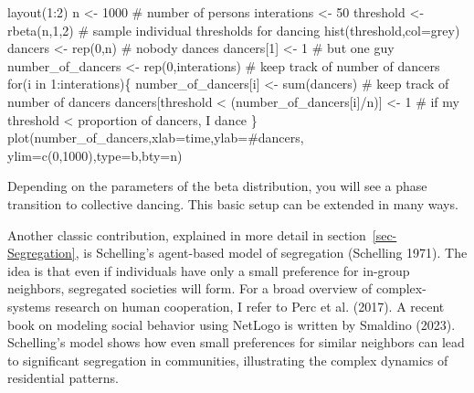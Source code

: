 \documentclass[
  a4paper,
  DIV=11,
  numbers=noendperiod,
  oneside]{scrreprt}
\newenvironment{Shaded}{}{}
\newcommand{\AttributeTok}[1]{\textcolor[rgb]{0.84,0.23,0.29}{#1}}
\newcommand{\CommentTok}[1]{\textcolor[rgb]{0.42,0.45,0.49}{#1}}
\newcommand{\ControlFlowTok}[1]{\textcolor[rgb]{0.84,0.23,0.29}{#1}}
\newcommand{\DecValTok}[1]{\textcolor[rgb]{0.00,0.36,0.77}{#1}}
\newcommand{\FunctionTok}[1]{\textcolor[rgb]{0.44,0.26,0.76}{#1}}
\newcommand{\NormalTok}[1]{\textcolor[rgb]{0.14,0.16,0.18}{#1}}
\newcommand{\OtherTok}[1]{\textcolor[rgb]{0.44,0.26,0.76}{#1}}
\newcommand{\SpecialCharTok}[1]{\textcolor[rgb]{0.00,0.36,0.77}{#1}}
\newcommand{\StringTok}[1]{\textcolor[rgb]{0.01,0.18,0.38}{#1}}
\begin{document}
\begin{Shaded}
\begin{Highlighting}[]
\FunctionTok{layout}\NormalTok{(}\DecValTok{1}\SpecialCharTok{:}\DecValTok{2}\NormalTok{)}
\NormalTok{n }\OtherTok{\textless{}{-}} \DecValTok{1000} \CommentTok{\# number of persons}
\NormalTok{interations }\OtherTok{\textless{}{-}} \DecValTok{50}
\NormalTok{threshold }\OtherTok{\textless{}{-}} \FunctionTok{rbeta}\NormalTok{(n,}\DecValTok{1}\NormalTok{,}\DecValTok{2}\NormalTok{) }\CommentTok{\# sample individual thresholds for dancing}
\FunctionTok{hist}\NormalTok{(threshold,}\AttributeTok{col=}\StringTok{\textquotesingle{}grey\textquotesingle{}}\NormalTok{)}
\NormalTok{dancers }\OtherTok{\textless{}{-}} \FunctionTok{rep}\NormalTok{(}\DecValTok{0}\NormalTok{,n) }\CommentTok{\# nobody dances}
\NormalTok{dancers[}\DecValTok{1}\NormalTok{] }\OtherTok{\textless{}{-}} \DecValTok{1} \CommentTok{\# but one guy}
\NormalTok{number\_of\_dancers }\OtherTok{\textless{}{-}} \FunctionTok{rep}\NormalTok{(}\DecValTok{0}\NormalTok{,interations) }\CommentTok{\# keep track of number of dancers}
\ControlFlowTok{for}\NormalTok{(i }\ControlFlowTok{in} \DecValTok{1}\SpecialCharTok{:}\NormalTok{interations)\{}
\NormalTok{  number\_of\_dancers[i] }\OtherTok{\textless{}{-}} \FunctionTok{sum}\NormalTok{(dancers) }\CommentTok{\# keep track of number of dancers}
\NormalTok{  dancers[threshold }\SpecialCharTok{\textless{}}\NormalTok{ (number\_of\_dancers[i]}\SpecialCharTok{/}\NormalTok{n)] }\OtherTok{\textless{}{-}} \DecValTok{1} 
\CommentTok{\# if my threshold \textless{} proportion of dancers, I dance}
\NormalTok{\}}
\FunctionTok{plot}\NormalTok{(number\_of\_dancers,}\AttributeTok{xlab=}\StringTok{\textquotesingle{}time\textquotesingle{}}\NormalTok{,}\AttributeTok{ylab=}\StringTok{\textquotesingle{}\#dancers\textquotesingle{}}\NormalTok{,}
     \AttributeTok{ylim=}\FunctionTok{c}\NormalTok{(}\DecValTok{0}\NormalTok{,}\DecValTok{1000}\NormalTok{),}\AttributeTok{type=}\StringTok{\textquotesingle{}b\textquotesingle{}}\NormalTok{,}\AttributeTok{bty=}\StringTok{\textquotesingle{}n\textquotesingle{}}\NormalTok{)}
\end{Highlighting}
\end{Shaded}

Depending on the parameters of the beta distribution, you will see a
phase transition to collective dancing. This basic setup can be extended
in many ways.

Another classic contribution, explained in more detail in
section~\ref{sec-Segregation}, is Schelling's agent-based model of
segregation (Schelling 1971). The idea is that even if individuals have
only a small preference for in-group neighbors, segregated societies
will form. For a broad overview of complex-systems research on human
cooperation, I refer to Perc et al. (2017). A recent book on modeling
social behavior using NetLogo is written by Smaldino (2023). Schelling's
model shows how even small preferences for similar neighbors can lead to
significant segregation in communities, illustrating the complex
dynamics of residential patterns.
\end{document}
